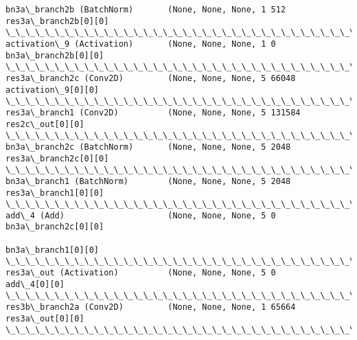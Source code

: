\documentclass[11pt]{article}
\begin{document}
\begin{Verbatim}[commandchars=\\\{\}]
bn3a\_branch2b (BatchNorm)       (None, None, None, 1 512         res3a\_branch2b[0][0]             
\_\_\_\_\_\_\_\_\_\_\_\_\_\_\_\_\_\_\_\_\_\_\_\_\_\_\_\_\_\_\_\_\_\_\_\_\_\_\_\_\_\_\_\_\_\_\_\_\_\_\_\_\_\_\_\_\_\_\_\_\_\_\_\_\_\_\_\_\_\_\_\_\_\_\_\_\_\_\_\_\_\_\_\_\_\_\_\_\_\_\_\_\_\_\_\_\_\_
activation\_9 (Activation)       (None, None, None, 1 0           bn3a\_branch2b[0][0]              
\_\_\_\_\_\_\_\_\_\_\_\_\_\_\_\_\_\_\_\_\_\_\_\_\_\_\_\_\_\_\_\_\_\_\_\_\_\_\_\_\_\_\_\_\_\_\_\_\_\_\_\_\_\_\_\_\_\_\_\_\_\_\_\_\_\_\_\_\_\_\_\_\_\_\_\_\_\_\_\_\_\_\_\_\_\_\_\_\_\_\_\_\_\_\_\_\_\_
res3a\_branch2c (Conv2D)         (None, None, None, 5 66048       activation\_9[0][0]               
\_\_\_\_\_\_\_\_\_\_\_\_\_\_\_\_\_\_\_\_\_\_\_\_\_\_\_\_\_\_\_\_\_\_\_\_\_\_\_\_\_\_\_\_\_\_\_\_\_\_\_\_\_\_\_\_\_\_\_\_\_\_\_\_\_\_\_\_\_\_\_\_\_\_\_\_\_\_\_\_\_\_\_\_\_\_\_\_\_\_\_\_\_\_\_\_\_\_
res3a\_branch1 (Conv2D)          (None, None, None, 5 131584      res2c\_out[0][0]                  
\_\_\_\_\_\_\_\_\_\_\_\_\_\_\_\_\_\_\_\_\_\_\_\_\_\_\_\_\_\_\_\_\_\_\_\_\_\_\_\_\_\_\_\_\_\_\_\_\_\_\_\_\_\_\_\_\_\_\_\_\_\_\_\_\_\_\_\_\_\_\_\_\_\_\_\_\_\_\_\_\_\_\_\_\_\_\_\_\_\_\_\_\_\_\_\_\_\_
bn3a\_branch2c (BatchNorm)       (None, None, None, 5 2048        res3a\_branch2c[0][0]             
\_\_\_\_\_\_\_\_\_\_\_\_\_\_\_\_\_\_\_\_\_\_\_\_\_\_\_\_\_\_\_\_\_\_\_\_\_\_\_\_\_\_\_\_\_\_\_\_\_\_\_\_\_\_\_\_\_\_\_\_\_\_\_\_\_\_\_\_\_\_\_\_\_\_\_\_\_\_\_\_\_\_\_\_\_\_\_\_\_\_\_\_\_\_\_\_\_\_
bn3a\_branch1 (BatchNorm)        (None, None, None, 5 2048        res3a\_branch1[0][0]              
\_\_\_\_\_\_\_\_\_\_\_\_\_\_\_\_\_\_\_\_\_\_\_\_\_\_\_\_\_\_\_\_\_\_\_\_\_\_\_\_\_\_\_\_\_\_\_\_\_\_\_\_\_\_\_\_\_\_\_\_\_\_\_\_\_\_\_\_\_\_\_\_\_\_\_\_\_\_\_\_\_\_\_\_\_\_\_\_\_\_\_\_\_\_\_\_\_\_
add\_4 (Add)                     (None, None, None, 5 0           bn3a\_branch2c[0][0]              
                                                                 bn3a\_branch1[0][0]               
\_\_\_\_\_\_\_\_\_\_\_\_\_\_\_\_\_\_\_\_\_\_\_\_\_\_\_\_\_\_\_\_\_\_\_\_\_\_\_\_\_\_\_\_\_\_\_\_\_\_\_\_\_\_\_\_\_\_\_\_\_\_\_\_\_\_\_\_\_\_\_\_\_\_\_\_\_\_\_\_\_\_\_\_\_\_\_\_\_\_\_\_\_\_\_\_\_\_
res3a\_out (Activation)          (None, None, None, 5 0           add\_4[0][0]                      
\_\_\_\_\_\_\_\_\_\_\_\_\_\_\_\_\_\_\_\_\_\_\_\_\_\_\_\_\_\_\_\_\_\_\_\_\_\_\_\_\_\_\_\_\_\_\_\_\_\_\_\_\_\_\_\_\_\_\_\_\_\_\_\_\_\_\_\_\_\_\_\_\_\_\_\_\_\_\_\_\_\_\_\_\_\_\_\_\_\_\_\_\_\_\_\_\_\_
res3b\_branch2a (Conv2D)         (None, None, None, 1 65664       res3a\_out[0][0]                  
\_\_\_\_\_\_\_\_\_\_\_\_\_\_\_\_\_\_\_\_\_\_\_\_\_\_\_\_\_\_\_\_\_\_\_\_\_\_\_\_\_\_\_\_\_\_\_\_\_\_\_\_\_\_\_\_\_\_\_\_\_\_\_\_\_\_\_\_\_\_\_\_\_\_\_\_\_\_\_\_\_\_\_\_\_\_\_\_\_\_\_\_\_\_\_\_\_\_

\end{Verbatim}
\end{document}
